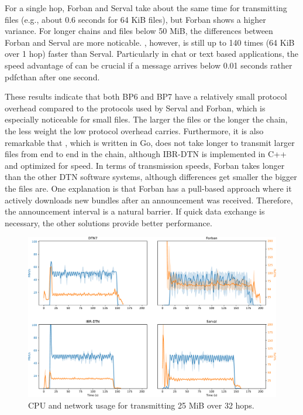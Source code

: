 For a single hop, Forban and Serval take about the same time for transmitting files (e.g., about 0.6 seconds for 64 KiB files), but Forban shows a higher variance.
For longer chains and files below 50 MiB, the differences between Forban and Serval are more noticable.
\dtn, however, is still up to 140 times (64 KiB over 1 hop) faster than Serval. %
Particularly in chat or text based applications, the speed advantage of \dtn can be crucial if a message arrives below 0.01 seconds rather pdfcthan after one second.

These results indicate that both BP6 and BP7 have a relatively small protocol overhead compared to the protocols used by Serval and Forban, which is especially noticeable for small files.
The larger the files or the longer the chain, the less weight the low protocol overhead carries.
Furthermore, it is also remarkable that \dtn, which is written in Go, does not take longer to transmit larger files from end to end in the chain, although IBR-DTN is implemented in C++ and optimized for speed.
In terms of transmission speeds, Forban takes longer than the other DTN software systems, although differences get smaller the bigger the files are. One explanation is that Forban has a pull-based approach where it actively downloads new bundles after an announcement was received. Therefore, the announcement interval is a natural barrier. If quick data exchange is necessary, the other solutions provide better performance.

\begin{figure}[ht!]
    \includegraphics[width=\columnwidth]{figs/cpu_network-crop.pdf}
    \caption{CPU and network usage for transmitting 25 MiB over 32 hops.}
    \label{penning2019dtn7:fig:cpu_net}
\end{figure}


